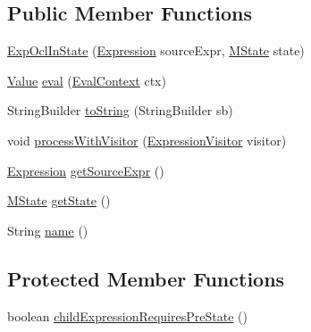 \subsection*{Public Member Functions}
\begin{DoxyCompactItemize}
\item 
\hyperlink{classorg_1_1tzi_1_1use_1_1uml_1_1ocl_1_1expr_1_1_exp_ocl_in_state_a11a2c486e98eb9917f3041afcfb58d78}{Exp\-Ocl\-In\-State} (\hyperlink{classorg_1_1tzi_1_1use_1_1uml_1_1ocl_1_1expr_1_1_expression}{Expression} source\-Expr, \hyperlink{classorg_1_1tzi_1_1use_1_1uml_1_1mm_1_1statemachines_1_1_m_state}{M\-State} state)
\item 
\hyperlink{classorg_1_1tzi_1_1use_1_1uml_1_1ocl_1_1value_1_1_value}{Value} \hyperlink{classorg_1_1tzi_1_1use_1_1uml_1_1ocl_1_1expr_1_1_exp_ocl_in_state_a89bdc43b0561b87b10dea01d6db1094c}{eval} (\hyperlink{classorg_1_1tzi_1_1use_1_1uml_1_1ocl_1_1expr_1_1_eval_context}{Eval\-Context} ctx)
\item 
String\-Builder \hyperlink{classorg_1_1tzi_1_1use_1_1uml_1_1ocl_1_1expr_1_1_exp_ocl_in_state_a80e6135c00e31085c39a769692a8bafe}{to\-String} (String\-Builder sb)
\item 
void \hyperlink{classorg_1_1tzi_1_1use_1_1uml_1_1ocl_1_1expr_1_1_exp_ocl_in_state_a8f628bbb309e20bb31fb045ce49db059}{process\-With\-Visitor} (\hyperlink{interfaceorg_1_1tzi_1_1use_1_1uml_1_1ocl_1_1expr_1_1_expression_visitor}{Expression\-Visitor} visitor)
\item 
\hyperlink{classorg_1_1tzi_1_1use_1_1uml_1_1ocl_1_1expr_1_1_expression}{Expression} \hyperlink{classorg_1_1tzi_1_1use_1_1uml_1_1ocl_1_1expr_1_1_exp_ocl_in_state_a01a80995fc3a889f5e814bfc5d492494}{get\-Source\-Expr} ()
\item 
\hyperlink{classorg_1_1tzi_1_1use_1_1uml_1_1mm_1_1statemachines_1_1_m_state}{M\-State} \hyperlink{classorg_1_1tzi_1_1use_1_1uml_1_1ocl_1_1expr_1_1_exp_ocl_in_state_a9872e3ca277a5acff422b730c6e52c92}{get\-State} ()
\item 
String \hyperlink{classorg_1_1tzi_1_1use_1_1uml_1_1ocl_1_1expr_1_1_exp_ocl_in_state_a64ba547c5771b1f55d6b1b9db68997b1}{name} ()
\end{DoxyCompactItemize}
\subsection*{Protected Member Functions}
\begin{DoxyCompactItemize}
\item 
boolean \hyperlink{classorg_1_1tzi_1_1use_1_1uml_1_1ocl_1_1expr_1_1_exp_ocl_in_state_a3ee333e83346c3b444fd06b5a4a598e6}{child\-Expression\-Requires\-Pre\-State} ()
\end{DoxyCompactItemize}



